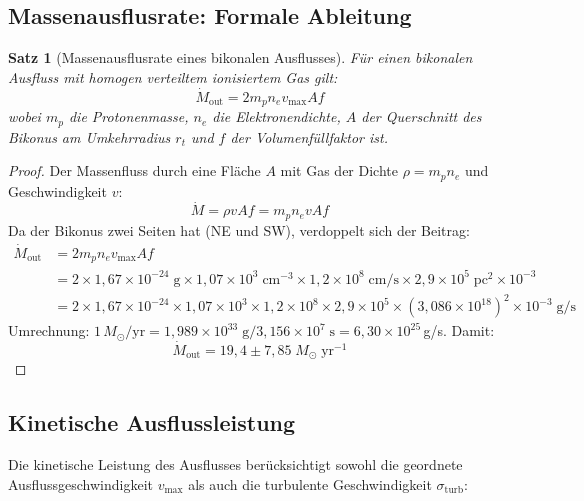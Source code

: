 ﻿\documentclass[12pt,a4paper]{report}
\newtheorem{theorem}{Satz}[chapter]
\begin{document}
\subsection{Massenausflusrate: Formale Ableitung}

\begin{theorem}[Massenausflusrate eines bikonalen Ausflusses]
	Für einen bikonalen Ausfluss mit homogen verteiltem ionisiertem Gas gilt:
	\begin{equation}
		\dot{M}_\mathrm{out} = 2 m_p n_e v_\mathrm{max} A f
	\end{equation}
	wobei $m_p$ die Protonenmasse, $n_e$ die Elektronendichte, $A$ der Querschnitt des Bikonus am Umkehrradius $r_t$ und $f$ der Volumenfüllfaktor ist.
\end{theorem}

\begin{proof}
	Der Massenfluss durch eine Fläche $A$ mit Gas der Dichte $\rho = m_p n_e$ und Geschwindigkeit $v$:
	\begin{equation}
		\dot{M} = \rho v A f = m_p n_e v A f
	\end{equation}
	Da der Bikonus zwei Seiten hat (NE und SW), verdoppelt sich der Beitrag:
	\begin{align}
		\dot{M}_\mathrm{out} &= 2 m_p n_e v_\mathrm{max} A f \\
		&= 2 \times 1{,}67 \times 10^{-24}\;\text{g} \times 1{,}07 \times 10^3\;\text{cm}^{-3} \times 1{,}2 \times 10^8\;\text{cm/s} \times 2{,}9 \times 10^5\;\text{pc}^2 \times 10^{-3} \\
		&= 2 \times 1{,}67 \times 10^{-24} \times 1{,}07 \times 10^3 \times 1{,}2 \times 10^8 \times 2{,}9 \times 10^5 \times (3{,}086 \times 10^{18})^2 \times 10^{-3}\;\text{g/s}
	\end{align}
	Umrechnung: $1\,M_\odot/\text{yr} = 1{,}989 \times 10^{33}\;\text{g} / 3{,}156 \times 10^7\;\text{s} = 6{,}30 \times 10^{25}$\,g/s. Damit:
	\begin{equation}
		\dot{M}_\mathrm{out} = 19{,}4 \pm 7{,}85\;M_\odot\;\text{yr}^{-1}
	\end{equation}
\end{proof}

\subsection{Kinetische Ausflussleistung}

Die kinetische Leistung des Ausflusses berücksichtigt sowohl die geordnete Ausfluss\-geschwindigkeit $v_\mathrm{max}$ als auch die turbulente Geschwindigkeit $\sigma_\mathrm{turb}$:
\end{document}
